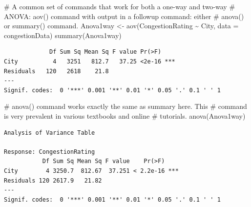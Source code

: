 \documentclass[
  letterpaper,
  DIV=11,
  numbers=noendperiod]{scrreprt}
\newenvironment{Shaded}{\begin{snugshade}}{\end{snugshade}}
\newcommand{\AttributeTok}[1]{\textcolor[rgb]{0.40,0.45,0.13}{#1}}
\newcommand{\CommentTok}[1]{\textcolor[rgb]{0.37,0.37,0.37}{#1}}
\newcommand{\FunctionTok}[1]{\textcolor[rgb]{0.28,0.35,0.67}{#1}}
\newcommand{\NormalTok}[1]{\textcolor[rgb]{0.00,0.23,0.31}{#1}}
\newcommand{\OtherTok}[1]{\textcolor[rgb]{0.00,0.23,0.31}{#1}}
\newcommand{\SpecialCharTok}[1]{\textcolor[rgb]{0.37,0.37,0.37}{#1}}
\begin{document}
\begin{Shaded}
\begin{Highlighting}[]
\CommentTok{\# A common set of commands that work for both a one{-}way and two{-}way}
\CommentTok{\# ANOVA: aov() command with output in a followup command: either}
\CommentTok{\# anova() or summary() command.}
\NormalTok{Anova1way }\OtherTok{\textless{}{-}} \FunctionTok{aov}\NormalTok{(CongestionRating }\SpecialCharTok{\textasciitilde{}}\NormalTok{ City, }\AttributeTok{data =}\NormalTok{ congestionData)}
\FunctionTok{summary}\NormalTok{(Anova1way)}
\end{Highlighting}
\end{Shaded}

\begin{verbatim}
             Df Sum Sq Mean Sq F value Pr(>F)    
City          4   3251   812.7   37.25 <2e-16 ***
Residuals   120   2618    21.8                   
---
Signif. codes:  0 '***' 0.001 '**' 0.01 '*' 0.05 '.' 0.1 ' ' 1
\end{verbatim}

\begin{Shaded}
\begin{Highlighting}[]
\CommentTok{\# anova() command works exactly the same as summary here.  This}
\CommentTok{\# command is very prevalent in various textbooks and online}
\CommentTok{\# tutorials.}
\FunctionTok{anova}\NormalTok{(Anova1way)}
\end{Highlighting}
\end{Shaded}

\begin{verbatim}
Analysis of Variance Table

Response: CongestionRating
           Df Sum Sq Mean Sq F value    Pr(>F)    
City        4 3250.7  812.67  37.251 < 2.2e-16 ***
Residuals 120 2617.9   21.82                      
---
Signif. codes:  0 '***' 0.001 '**' 0.01 '*' 0.05 '.' 0.1 ' ' 1
\end{verbatim}
\end{document}
